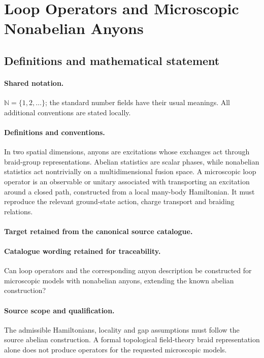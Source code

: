 \documentclass[11pt]{article}
\begin{document}
\section{Loop Operators and Microscopic Nonabelian Anyons}\label{statement}

\subsection{Definitions and mathematical statement}

\paragraph{Shared notation.}$\mathbb N=\{1,2,\ldots\}$; the standard number fields have their usual meanings. All additional conventions are stated locally.


\paragraph{Definitions and conventions.}
In two spatial dimensions, anyons are excitations whose exchanges act through braid-group representations. Abelian statistics are scalar phases, while nonabelian statistics act nontrivially on a multidimensional fusion space. A microscopic loop operator is an observable or unitary associated with transporting an excitation around a closed path, constructed from a local many-body Hamiltonian. It must reproduce the relevant ground-state action, charge transport and braiding relations.

\paragraph{Target retained from the canonical source catalogue.}
\paragraph{Catalogue wording retained for traceability.}
Can loop operators and the corresponding anyon description be constructed for microscopic models with nonabelian anyons, extending the known abelian construction?

\paragraph{Source scope and qualification.}
The admissible Hamiltonians, locality and gap assumptions must follow the source abelian construction. A formal topological field-theory braid representation alone does not produce operators for the requested microscopic models.
\end{document}

